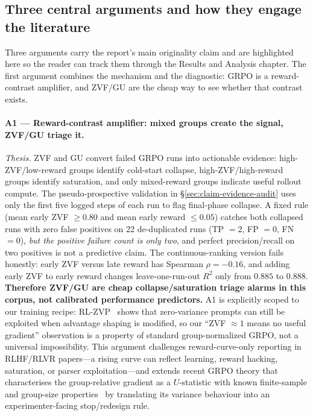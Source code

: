 \documentclass[12pt,a4paper]{report}
\begin{document}
\subsection*{Three central arguments and how they engage the literature}

Three arguments carry the report's main originality claim and are highlighted here so the reader can track them through the Results and Analysis chapter. The first argument combines the mechanism and the diagnostic: GRPO is a reward-contrast amplifier, and ZVF/GU are the cheap way to see whether that contrast exists.

\paragraph{A1 --- Reward-contrast amplifier: mixed groups create the signal, ZVF/GU triage it.}
\emph{Thesis.} ZVF and GU convert failed GRPO runs into actionable evidence: high-ZVF/low-reward groups identify cold-start collapse, high-ZVF/high-reward groups identify saturation, and only mixed-reward groups indicate useful rollout compute. The pseudo-prospective validation in \S\ref{sec:claim-evidence-audit} uses only the first five logged steps of each run to flag final-phase collapse. A fixed rule (mean early ZVF $\geq 0.80$ and mean early reward $\leq 0.05$) catches both collapsed runs with zero false positives on 22 de-duplicated runs (TP $=2$, FP $=0$, FN $=0$), \emph{but the positive failure count is only two}, and perfect precision/recall on two positives is not a predictive claim. The continuous-ranking version fails honestly: early ZVF versus late reward has Spearman $\rho=-0.16$, and adding early ZVF to early reward changes leave-one-run-out $R^{2}$ only from $0.885$ to $0.888$. \textbf{Therefore ZVF/GU are cheap collapse/saturation triage alarms in this corpus, not calibrated performance predictors.} A1 is explicitly scoped to our training recipe: RL-ZVP~\citep{rlzvp2025} shows that zero-variance prompts can still be exploited when advantage shaping is modified, so our ``ZVF $\approx 1$ means no useful gradient'' observation is a property of standard group-normalized GRPO, not a universal impossibility. This argument challenges reward-curve-only reporting in RLHF/RLVR papers---a rising curve can reflect learning, reward hacking, saturation, or parser exploitation---and extends recent GRPO theory that characterises the group-relative gradient as a $U$-statistic with known finite-sample and group-size properties~\citep{zhou2026demystify} by translating its variance behaviour into an experimenter-facing stop/redesign rule.
\end{document}

